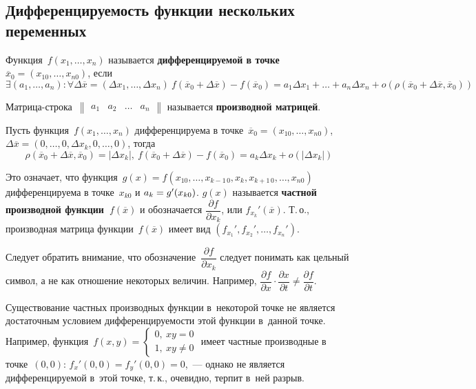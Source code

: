 \subsection{Дифференцируемость функции нескольких переменных}
 Функция~$f(x_1, \ldots, x_n)$ называется \textbf{дифференцируемой в точке~$\overline x_0 = (x_{10}, \ldots, x_{n0})$}, если
\begin{equation*}
\exists (a_1, \ldots, a_n) \colon \forall \Delta \overline x = (\Delta x_1, \ldots, \Delta x_n) \
f(\overline x_0 + \Delta \overline x) - f(\overline x_0) =
a_1 \Delta x_1 + \ldots + a_n \Delta x_n + o(\rho(\overline x_0 + \Delta \overline x, \overline x_0))
\end{equation*}

 Матрица-строка~$\begin{Vmatrix}
a_1 & a_2 & \ldots & a_n
\end{Vmatrix}$ называется \textbf{производной матрицей}.

Пусть функция~$f(x_1, \ldots, x_n)$ дифференцируема в точке~$\overline x_0 = (x_{10}, \ldots, x_{n0})$, $\Delta \overline x = (0, \ldots, 0, \Delta x_k, 0, \ldots, 0)$, тогда
\begin{equation*}
\rho(\overline x_0 + \Delta \overline x, \overline x_0) = |\Delta x_k|, \
f(\overline x_0 + \Delta \overline x) - f(\overline x_0) =
a_k \Delta x_k + o(|\Delta x_k|)
\end{equation*}

Это означает, что функция~$g(x) = f(x_{10}, \ldots, x_{k-1\, 0}, x_k, x_{k+1\, 0}, \ldots, x_{n0})$ дифференцируема в точке~$x_{k0}$ и $a_k \opbr= g'(x_{k0})$.
 $g(x)$ называется \textbf{частной производной функции~$f(\overline x)$} и обозначается $\dfrac{\partial f}{\partial x_k}$, или $f_{x_k}'(\overline x)$.
Т.\,о., производная матрица функции~$f(\overline x)$ имеет вид $(f_{x_1}', f_{x_2}', \ldots, f_{x_n}')$.

Следует обратить внимание, что обозначение~$\dfrac{\partial f}{\partial x_k}$ следует понимать как цельный символ, а не как отношение некоторых величин.
Например, $\dfrac{\partial f}{\partial x} \cdot \dfrac{\partial x}{\partial t} \neq \dfrac{\partial f}{\partial t}$.

Существование частных производных функции в~некоторой точке не является достаточным условием дифференцируемости этой функции в~данной точке.
Например, функция~$f(x, y) =
\begin{cases}
0, \ xy = 0 \\
1, \ xy \neq 0
\end{cases}$
имеет частные производные в точке~$(0, 0)$: $f_x'(0, 0) = f_y'(0, 0) = 0$,~--- однако не является дифференцируемой в~этой точке, т.\,к., очевидно, терпит в~ней разрыв.

